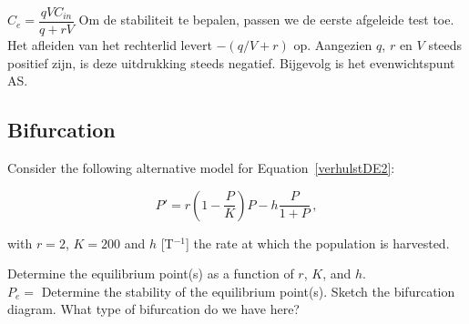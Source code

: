 \begin{Answer}
    \Question $C_e = \dfrac{qVC_{in}}{q+rV}$
    \Question Om de stabiliteit te bepalen, passen we de eerste afgeleide test toe. Het afleiden van het rechterlid levert $-(q/V + r)$ op. Aangezien $q$, $r$ en $V$ steeds positief zijn, is deze uitdrukking steeds negatief. Bijgevolg is het evenwichtspunt AS. 
    \EndCurrentQuestion
\end{Answer}



\subsection{Bifurcation}
\begin{Exercise} Consider the following alternative model for Equation~\eqref{verhulstDE2}:

\begin{equation}\label{eq:Palternatief}
P' = r\left(1-\dfrac{P}{K}\right)P - h\dfrac{P}{1 + P}\,, 
\end{equation} %

with $r = 2$, $K = 200$ and $h$ [T$^{-1}$] the rate at which the population is harvested.
	
		\Question Determine the equilibrium point(s) as a function of $r$, $K$, and $h$.\\[0.5cm]
		$P_e = $\vspace*{1cm}
		\Question Determine the stability of the equilibrium point(s).
		\Question Sketch the bifurcation diagram. What type of bifurcation do we have here? \\[5cm]
\end{Exercise}

